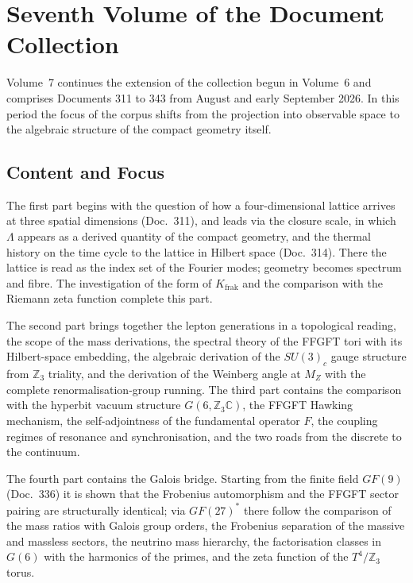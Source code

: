 
\section*{Seventh Volume of the Document Collection}

Volume~7 continues the extension of the collection begun in Volume~6 and
comprises Documents 311 to 343 from August and early September 2026. In this
period the focus of the corpus shifts from the projection into observable
space to the algebraic structure of the compact geometry itself.

\subsection*{Content and Focus}

The first part begins with the question of how a four-dimensional lattice
arrives at three spatial dimensions (Doc.~311), and leads via the closure
scale, in which $\Lambda$ appears as a derived quantity of the compact
geometry, and the thermal history on the time cycle to the lattice in Hilbert
space (Doc.~314). There the lattice is read as the index set of the Fourier
modes; geometry becomes spectrum and fibre. The investigation of the form of
$K_\text{frak}$ and the comparison with the Riemann zeta function complete
this part.

The second part brings together the lepton generations in a topological
reading, the scope of the mass derivations, the spectral theory of the FFGFT
tori with its Hilbert-space embedding, the algebraic derivation of the
$SU(3)_c$ gauge structure from $\mathbb{Z}_3$ triality, and the derivation of
the Weinberg angle at $M_Z$ with the complete renormalisation-group running.
The third part contains the comparison with the hyperbit vacuum structure
$G(6,\mathbb{Z}_3\mathbb{C})$, the FFGFT Hawking mechanism, the
self-adjointness of the fundamental operator $\hat F$, the coupling regimes of
resonance and synchronisation, and the two roads from the discrete to the
continuum.

The fourth part contains the Galois bridge. Starting from the finite field
$GF(9)$ (Doc.~336) it is shown that the Frobenius automorphism and the FFGFT
sector pairing are structurally identical; via $GF(27)^*$ there follow the
comparison of the mass ratios with Galois group orders, the Frobenius
separation of the massive and massless sectors, the neutrino mass hierarchy,
the factorisation classes in $G(6)$ with the harmonics of the primes, and the
zeta function of the $T^4/\mathbb{Z}_3$ torus.

